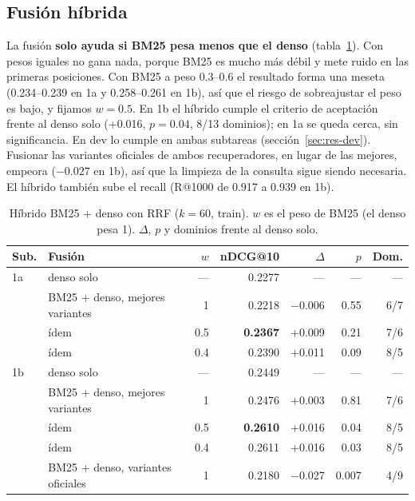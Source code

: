 \documentclass[11pt,a4paper]{article}
\begin{document}
\subsection{Fusión híbrida}
\label{sec:res-hibrido}

La fusión \textbf{solo ayuda si BM25 pesa menos que el denso} (tabla~\ref{tab:hibrido}). Con pesos iguales no gana nada, porque BM25 es mucho más débil y mete ruido en las primeras posiciones. Con BM25 a peso 0.3--0.6 el resultado forma una meseta (0.234--0.239 en 1a y 0.258--0.261 en 1b), así que el riesgo de sobreajustar el peso es bajo, y fijamos $w = 0.5$. En 1b el híbrido cumple el criterio de aceptación frente al denso solo (+0.016, $p = 0.04$, 8/13 dominios); en 1a se queda cerca, sin significancia. En dev lo cumple en ambas subtareas (sección~\ref{sec:res-dev}). Fusionar las variantes oficiales de ambos recuperadores, en lugar de las mejores, empeora ($-0.027$ en 1b), así que la limpieza de la consulta sigue siendo necesaria. El híbrido también sube el recall (R@1000 de 0.917 a 0.939 en 1b).

\begin{table}[t]
\centering
\caption{Híbrido BM25 + denso con RRF ($k = 60$, train). $w$ es el peso de BM25 (el denso pesa 1). $\Delta$, $p$ y dominios frente al denso solo.}
\label{tab:hibrido}
\small
\begin{tabular}{llrrrrr}
\toprule
Sub. & Fusión & $w$ & nDCG@10 & $\Delta$ & $p$ & Dom. \\
\midrule
1a & denso solo & --- & 0.2277 & --- & --- & --- \\
   & BM25 + denso, mejores variantes & 1 & 0.2218 & $-$0.006 & 0.55 & 6/7 \\
   & ídem & 0.5 & \textbf{0.2367} & +0.009 & 0.21 & 7/6 \\
   & ídem & 0.4 & 0.2390 & +0.011 & 0.09 & 8/5 \\
\midrule
1b & denso solo & --- & 0.2449 & --- & --- & --- \\
   & BM25 + denso, mejores variantes & 1 & 0.2476 & +0.003 & 0.81 & 7/6 \\
   & ídem & 0.5 & \textbf{0.2610} & +0.016 & 0.04 & 8/5 \\
   & ídem & 0.4 & 0.2611 & +0.016 & 0.03 & 8/5 \\
   & BM25 + denso, variantes oficiales & 1 & 0.2180 & $-$0.027 & 0.007 & 4/9 \\
\bottomrule
\end{tabular}
\end{table}
\end{document}
